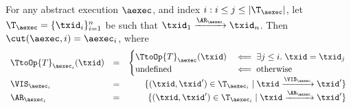 \begin{lemma}
\label{lem:cut.explicit}
For any abstract execution $\aexec$, and index $i: i \leq j \leq \lvert \T_{\aexec} \rvert$, 
let $\T_{\aexec} = \{\txid_{i}\}_{i=1}^{n}$ be such that $\txid_{1} \xrightarrow{\AR_{\aexec}}
\txid_{n}$. Then $\cut(\aexec, i) = \aexec_{i}$, where 
\[
\begin{array}{lcr}
\TtoOp{T}_{\aexec_{i}}(\txid) &=& 
\begin{cases}
\TtoOp{T}_{\aexec}(\txid) &\impliedby \exists j \leq i.\; \txid = \txid_{j}\\
\text{undefined} &\impliedby \text{otherwise}\\
\end{cases}
\\
\VIS_{\aexec_{i}} &=& \{ (\txid, \txid') \in \T_{\aexec_{i}} \mid \txid \xrightarrow{\VIS_{\aexec}} \txid'\}\\
\AR_{\aexec_{i}} &=& \{ (\txid, \txid') \in \T_{\aexec_{i}} \mid \txid \xrightarrow{\AR_{\aexec}} \txid'\}
\end{array}
\]
\end{lemma}


